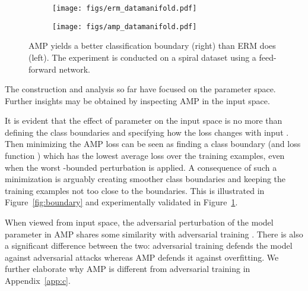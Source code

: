 \documentclass[final]{cvpr}
\begin{document}
\begin{figure}[t]
\centering
\begin{subfigure}{0.45\columnwidth}\centering \texttt{[image: figs/erm\_datamanifold.pdf]}\end{subfigure}\begin{subfigure}{0.45\columnwidth}\centering \texttt{[image: figs/amp\_datamanifold.pdf]}\end{subfigure}\caption{AMP yields a better classification boundary (right) than ERM does (left). The experiment is conducted on a spiral dataset \cite{sugiyama2015introduction} using a feed-forward network.}
\label{fig:datamanifold}
\end{figure}

The construction and analysis so far have focused on the parameter space. Further insights may be obtained by inspecting AMP in the input space. 

It is evident that the effect of parameter  on the input space is no more than defining the class boundaries and specifying how the loss  changes with input . Then minimizing the AMP loss can be seen as finding a class boundary (and loss function ) which has the lowest average loss over the training examples, even when the worst -bounded perturbation is applied. A consequence of such a minimization is arguably creating smoother class boundaries and keeping the training examples not too close to the boundaries. This is illustrated in Figure~\ref{fig:boundary} and experimentally validated in Figure~\ref{fig:datamanifold}. 

When viewed from input space, the adversarial perturbation of the model parameter in AMP shares some similarity with adversarial training \cite{goodfellow2015explaining}. There is also a significant difference between the two: adversarial training defends the model against adversarial attacks whereas AMP defends it against overfitting. We further elaborate why AMP is different from adversarial training in Appendix~\ref{app:c}.
\end{document}

